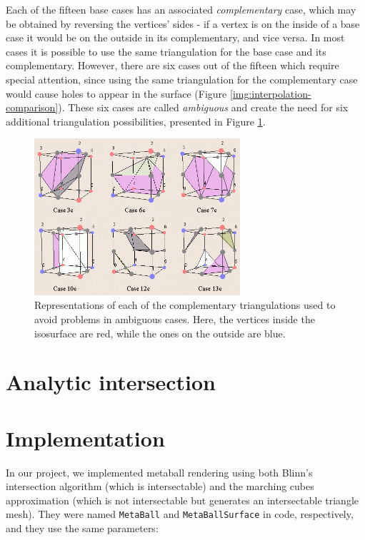 \documentclass[conference]{acmsiggraph}
\begin{document}
Each of the fifteen base cases has an associated \textit{complementary} case, which may be obtained by reversing the vertices' sides - if a vertex is on the inside of a base case it would be on the outside in its complementary, and vice versa. In most cases it is possible to use the same triangulation for the base case and its complementary. However, there are six cases out of the fifteen which require special attention, since using the same triangulation for the complementary case would cause holes to appear in the surface (Figure \ref{img:interpolation-comparison}). These six cases are called \textit{ambiguous} and create the need for six additional triangulation possibilities, presented in Figure \ref{img:ambiguous-cases}.

\begin{figure}[ht]
  \centering
  \includegraphics[width=3in]{images/ambiguous-cases}
  \caption{Representations of each of the complementary triangulations used to avoid problems in ambiguous cases. Here, the vertices inside the isosurface are red, while the ones on the outside are blue.}
  \label{img:ambiguous-cases}
\end{figure}

\section{Analytic intersection}

\section{Implementation}

In our project, we implemented metaball rendering using both Blinn's
intersection algorithm (which is intersectable) and the marching cubes
approximation (which is not intersectable but generates an intersectable 
triangle mesh). They were named \texttt{MetaBall} and \texttt{MetaBallSurface} 
in code, respectively, and they use the same parameters:
\end{document}
